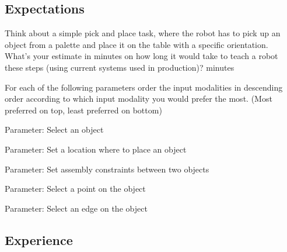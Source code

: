 \subsection{Expectations}
\label{app:questionnaire_expectation}


\begin{question}{6}{Think about a simple pick and place task, where the robot has to pick up an object from a palette and place it on the table with a specific orientation.\\
		What's your estimate in minutes on how long it would take to teach a robot these steps (using current systems used in production)?}
	\fbox{
		\begin{minipage}{2cm}
			\hfill\vspace{1.2em}
		\end{minipage}
	} minutes
\end{question}

For each of the following parameters order the input modalities in descending order according to which input modality you would prefer the most. (Most preferred on top, least preferred on bottom)


\begin{question}{7}{Parameter: Select an object}
\end{question}


\begin{question}{8}{Parameter: Set a location where to place an object}
\end{question}


\begin{question}{9}{Parameter: Set assembly constraints between two objects}
\end{question}


\begin{question}{10}{Parameter: Select a point on the object}
\end{question}


\begin{question}{11}{Parameter: Select an edge on the object}
\end{question}

\subsection{Experience}
\label{app:questionnaire_experience}


